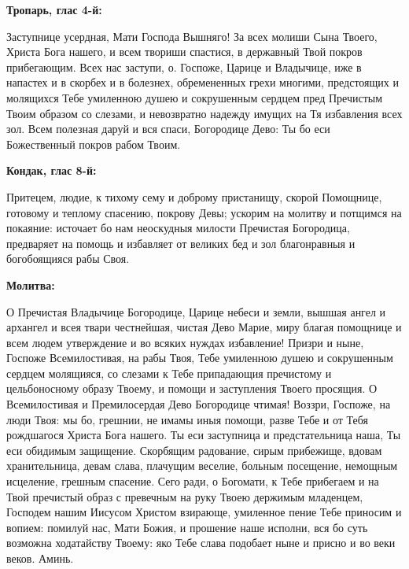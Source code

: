 
\bfseries Тропарь, глас 4-й:\normalfont{}\nopagebreak


Заступнице усердная, Мати Господа Вышняго! За всех молиши Сына Твоего, Христа Бога нашего, и всем твориши спастися, в державный Твой покров прибегающим. Всех нас заступи, о. Госпоже, Царице и Владычице, иже в напастех и в скорбех и в болезнех, обремененных грехи многими, предстоящих и молящихся Тебе умиленною душею и сокрушенным сердцем пред Пречистым Твоим образом со слезами, и невозвратно надежду имущих на Тя избавления всех зол. Всем полезная даруй и вся спаси, Богородице Дево: Ты бо еси Божественный покров рабом Твоим.


\medskip


\bfseries Кондак, глас 8-й\normalfont{}:


Притецем, людие, к тихому сему и доброму пристанищу, скорой Помощнице, готовому и теплому спасению, покрову Девы; ускорим на молитву и потщимся на покаяние: источает бо нам неоскудныя милости Пречистая Богородица, предваряет на помощь и избавляет от великих бед и зол благонравныя и богобоящияся рабы Своя.


\medskip


\bfseries Молитва:\normalfont{}\nopagebreak


О Пречистая Владычице Богородице, Царице небеси и земли, вышшая ангел и архангел и всея твари честнейшая, чистая Дево Марие, миру благая помощнице и всем людем утверждение и во всяких нуждах избавление! Призри и ныне, Госпоже Всемилостивая, на рабы Твоя, Тебе умиленною душею и сокрушенным сердцем молящияся, со слезами к Тебе припадающия пречистому и цельбоносному образу Твоему, и помощи и заступления Твоего просящия. О Всемилостивая и Премилосердая Дево Богородице чтимая! Воззри, Госпоже, на люди Твоя: мы бо, грешнии, не имамы иныя помощи, разве Тебе и от Тебя рождшагося Христа Бога нашего. Ты еси заступница и предстательница наша, Ты еси обидимым защищение. Скорбящим радование, сирым прибежище, вдовам хранительница, девам слава, плачущим веселие, больным посещение, немощным исцеление, грешным спасение. Сего ради, о Богомати, к Тебе прибегаем и на Твой пречистый образ с превечным на руку Твоею держимым младенцем, Господем нашим Иисусом Христом взирающе, умиленное пение Тебе приносим и вопием: помилуй нас, Мати Божия, и прошение наше исполни, вся бо суть возможна ходатайству Твоему: яко Тебе слава подобает ныне и присно и во веки веков. Аминь.
\nopagebreak\bigskip\bigskip\mychapterending

 
